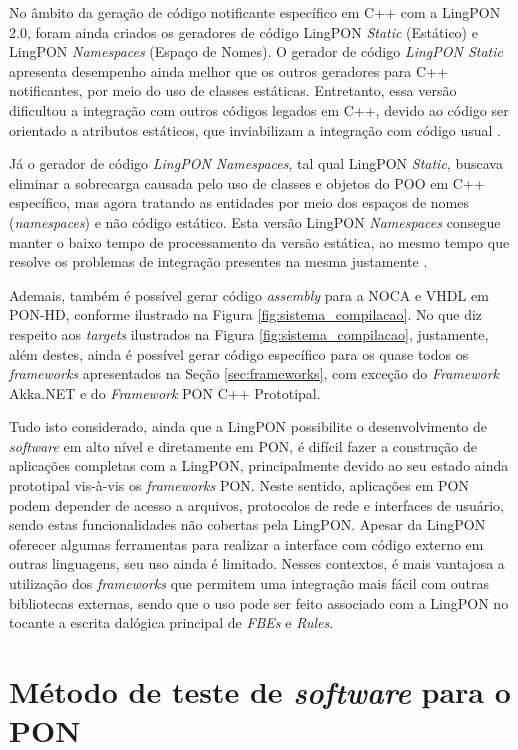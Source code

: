 No âmbito da geração de código notificante específico em C++ com a LingPON 2.0,
foram ainda criados os geradores de código LingPON \textit{Static} (Estático) e
LingPON \textit{Namespaces} (Espaço de Nomes). O gerador de código
\textit{LingPON Static} apresenta desempenho ainda melhor que os outros
geradores para C++ notificantes, por meio do uso de classes estáticas.
Entretanto, essa versão dificultou a integração com outros códigos legados em
C++, devido ao código ser orientado a atributos estáticos, que inviabilizam a
integração com código usual \cite{schutz_2015}.

Já o gerador de código \textit{LingPON Namespaces}, tal qual LingPON
\textit{Static}, buscava eliminar a sobrecarga causada pelo uso de classes e
objetos do POO em C++ específico, mas agora tratando as entidades por meio dos
espaços de nomes (\textit{namespaces}) e não código estático. Esta versão
LingPON \textit{Namespaces} consegue manter o baixo tempo de processamento da versão
estática, ao mesmo tempo que resolve os problemas de integração presentes na
mesma justamente \cite{athayde_2016}.

Ademais, também é possível gerar código \textit{assembly} para a NOCA e VHDL em
PON-HD, conforme ilustrado na Figura \ref{fig:sistema_compilacao}. No que diz
respeito aos \textit{targets} ilustrados na Figura \ref{fig:sistema_compilacao},
justamente, além destes, ainda é possível gerar código específico para os quase todos os
\textit{frameworks} apresentados na Seção \ref{sec:frameworks}, com exceção do
\textit{Framework} Akka.NET e do \textit{Framework} PON C++ Prototipal.

Tudo isto considerado, ainda que a LingPON possibilite o desenvolvimento de
\textit{software} em alto nível e diretamente em PON, é difícil fazer a
construção de aplicações completas com a LingPON, principalmente devido ao seu
estado ainda prototipal vis-à-vis os \textit{frameworks} PON. Neste sentido,
aplicações em PON podem depender de acesso a arquivos, protocolos de rede e
interfaces de usuário, sendo estas funcionalidades não cobertas pela LingPON.
Apesar da LingPON oferecer algumas ferramentas para realizar a interface com
código externo em outras linguagens, seu uso ainda é limitado. Nesses contextos,
é mais vantajosa a utilização dos \textit{frameworks} que permitem uma
integração mais fácil com outras bibliotecas externas, sendo que o uso pode ser
feito associado com a LingPON no tocante a escrita dalógica principal de
\textit{FBEs} e \textit{Rules}.

\clearpage
\section{Método de teste de \textit{software} para o PON}\label{sec:test_pon}

